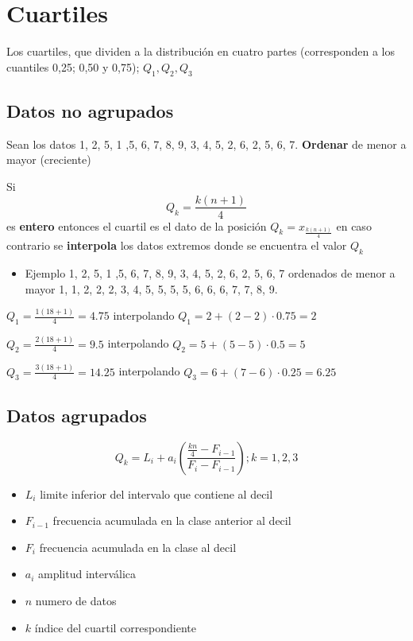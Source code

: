 \documentclass[
  11pt,
]{krantz}
\providecommand{\tightlist}{%
  \setlength{\itemsep}{0pt}\setlength{\parskip}{0pt}}
\theoremstyle{definition}
\theoremstyle{definition}
\theoremstyle{definition}
\theoremstyle{definition}
\theoremstyle{remark}
\begin{document}
\hypertarget{cuartiles}{%
\section{Cuartiles}\label{cuartiles}}

Los cuartiles, que dividen a la distribución en cuatro partes (corresponden a los cuantiles 0,25; 0,50 y 0,75); \(Q_1, Q_2, Q_3\)

\hypertarget{datos-no-agrupados}{%
\subsection{Datos no agrupados}\label{datos-no-agrupados}}

Sean los datos 1, 2, 5, 1 ,5, 6, 7, 8, 9, 3, 4, 5, 2, 6, 2, 5, 6, 7. \textbf{Ordenar} de menor a mayor (creciente)

Si \[Q_k=\frac{k(n+1)}{4}\] es \textbf{entero} entonces el cuartil es el dato de la posición \(Q_k=x_\frac{k(n+1)}{4}\) en caso contrario se \textbf{interpola} los datos extremos donde se encuentra el valor \(Q_k\)

\begin{itemize}
\tightlist
\item
  Ejemplo 1, 2, 5, 1 ,5, 6, 7, 8, 9, 3, 4, 5, 2, 6, 2, 5, 6, 7 ordenados de menor a mayor 1, 1, 2, 2, 2, 3, 4, 5, 5, 5, 5, 6, 6, 6, 7, 7, 8, 9.
\end{itemize}

\(Q_1=\frac{1(18+1)}{4}=4.75\) interpolando \(Q_1=2+(2-2)\cdot 0.75=2\)

\(Q_2=\frac{2(18+1)}{4}=9.5\) interpolando \(Q_2=5+(5-5)\cdot 0.5=5\)

\(Q_3=\frac{3(18+1)}{4}=14.25\) interpolando \(Q_3=6+(7-6)\cdot 0.25=6.25\)

\hypertarget{datos-agrupados}{%
\subsection{Datos agrupados}\label{datos-agrupados}}

\[Q_k=L_i+ a_i\left(\frac{\frac{kn}{4}-F_{i-1}}{F_i-F_{i-1}}\right);k=1,2,3\]

\begin{itemize}
\tightlist
\item
  \(L_i\) limite inferior del intervalo que contiene al decil
\item
  \(F_{i-1}\) frecuencia acumulada en la clase anterior al decil
\item
  \(F_i\) frecuencia acumulada en la clase al decil
\item
  \(a_i\) amplitud interválica
\item
  \(n\) numero de datos
\item
  \(k\) índice del cuartil correspondiente
\end{itemize}
\end{document}
